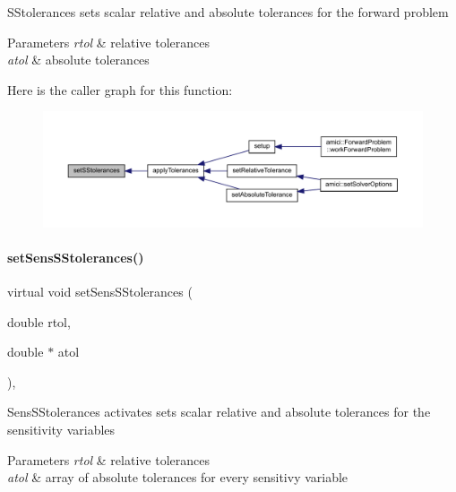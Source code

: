 S\+Stolerances sets scalar relative and absolute tolerances for the forward problem


\begin{DoxyParams}{Parameters}
{\em rtol} & relative tolerances \\
\hline
{\em atol} & absolute tolerances \\
\hline
\end{DoxyParams}
Here is the caller graph for this function\+:
\nopagebreak
\begin{figure}[H]
\begin{center}
\leavevmode
\includegraphics[width=350pt]{classamici_1_1_solver_a6a688afa51ec71eded6c8801faaafac3_icgraph}
\end{center}
\end{figure}
\mbox{\label{classamici_1_1_solver_a16ec3b994dd433e71fcb58eea3cd529f}} 
\paragraph{\texorpdfstring{set\+Sens\+S\+Stolerances()}{setSensSStolerances()}}
{\footnotesize\ttfamily virtual void set\+Sens\+S\+Stolerances (\begin{DoxyParamCaption}\item[{double}]{rtol,  }\item[{double $\ast$}]{atol }\end{DoxyParamCaption})\hspace{0.3cm}{\ttfamily [protected]}, {}}

Sens\+S\+Stolerances activates sets scalar relative and absolute tolerances for the sensitivity variables


\begin{DoxyParams}{Parameters}
{\em rtol} & relative tolerances \\
\hline
{\em atol} & array of absolute tolerances for every sensitivy variable \\
\hline
\end{DoxyParams}
\mbox{\label{classamici_1_1_solver_a1928530b3110cb9229d6836c5389379f}} 
